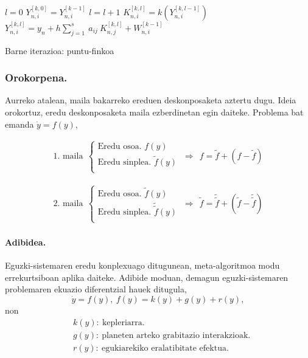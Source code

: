 \begin{algorithm}[H]
 \BlankLine
  $l=0$\;
  $Y_{n,i}^{[k,0]}=Y_{n,i}^{[k-1]}$\;
  {
   \BlankLine
   $l=l+1$\;  
   \BlankLine
   $K_{n,i}^{[k,l]}=k(Y_{n,i}^{[k,l-1]})$\;
   $Y_{n,i}^{[k,l]}=y_{n} + h \sum\limits_{j=1}^{s} \ a_{ij} \ K_{n,j}^{[k,l]}  +  W_{n,i}^{[k-1]} $\;
  }
 \caption{Barne iterazioa: puntu-finkoa}
\end{algorithm}

\subsubsection*{Orokorpena.}

Aurreko atalean, maila bakarreko ereduen deskonposaketa aztertu dugu. Ideia orokortuz, eredu deskonposaketa maila ezberdinetan egin daiteke. Problema bat emanda $\dot{y} =f(y)$, 

\begin{align}
\mbox{1. maila} \ \
\left \{ \begin{array}{c}
  \mbox{Eredu osoa.   } f(y) \\[.25cm]
  \mbox{Eredu sinplea.    } \tilde{f}(y)  \\
\end{array} \right.
\ \Rightarrow \ \
f =\tilde{f}+(f-\tilde{f})  
\end{align}

\begin{align}
\mbox{2. maila} \ \
\left \{ \begin{array}{c}
  \mbox{Eredu osoa.   }\tilde{f}(y) \\[.25cm]
  \mbox{Eredu sinplea.    }\tilde{\tilde{f}}(y)  \\
\end{array} \right.
\ \Rightarrow \ \
\tilde{f} =\tilde{\tilde{f}}+({\tilde{f}}-\tilde{\tilde{f}})  
\end{align}

\paragraph*{Adibidea.}
Eguzki-sistemaren eredu konplexuago ditugunean, meta-algoritmoa modu errekurtsiboan aplika daiteke. Adibide moduan, demagun eguzki-sistemaren problemaren ekuazio diferentzial hauek ditugula,
\begin{equation*}
\dot{y}=f(y), \ f(y)=k(y)+g(y)+r(y),
\end{equation*}
non
\begin{align*}
&k(y): \ \text{kepleriarra.}\\
&g(y): \ \text{planeten arteko grabitazio interakzioak.}\\
&r(y): \ \text{egukiarekiko eralatibitate efektua.}
\end{align*}

